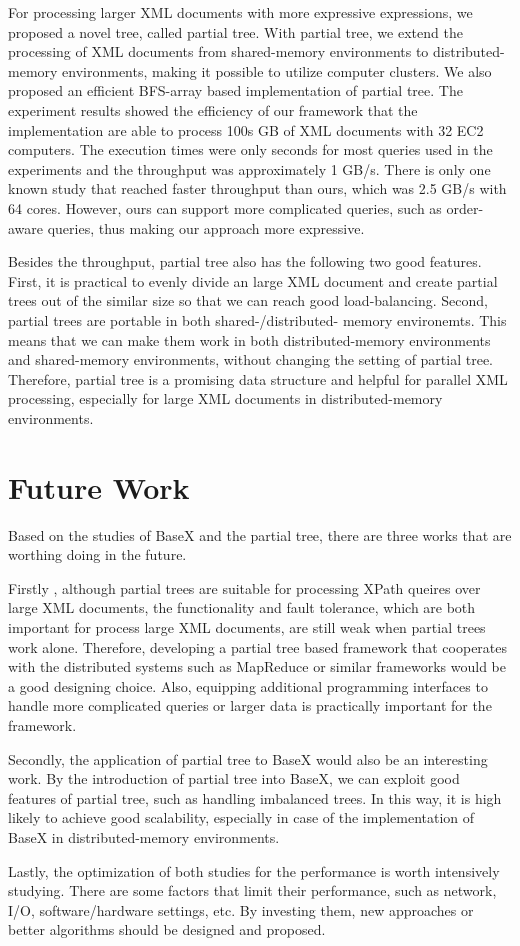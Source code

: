 For processing larger XML documents with more expressive expressions, 
we proposed a novel tree, called partial
tree. With partial tree, we extend the processing of XML documents from
shared-memory environments to distributed-memory environments, making it
possible to utilize computer clusters. We also proposed an efficient BFS-array
based implementation of partial tree. The experiment results showed the
efficiency of our framework that the implementation are able to process 100s GB
of XML documents with 32 EC2 computers. The execution times were only seconds
for most queries used in the experiments and the throughput was approximately 1
GB/s. There is only one known study that reached faster throughput than ours,
which was 2.5 GB/s with 64 cores. However, ours can support more complicated
queries, such as order-aware queries, thus making our approach more expressive.

Besides the throughput, partial tree also has the following two good features.
First, it is practical to evenly divide an large XML document and create partial
trees out of the similar size so that we can reach good load-balancing. Second,
partial trees are portable in both shared-/distributed- memory environemts. This
means that we can make them work in both distributed-memory environments and
shared-memory environments, without changing the setting of partial tree.
Therefore, partial tree is a promising data structure and helpful for parallel
XML processing, especially for large XML documents in distributed-memory
environments.

\section{Future Work}

Based on the studies of BaseX and the partial tree, there are three works that
are worthing doing in the future.


Firstly , although partial trees are suitable for processing XPath queires over
large XML documents, the functionality and fault tolerance, which are both
important for process large XML documents, are still weak when partial trees
work alone. Therefore, developing a partial tree based framework that cooperates
with the distributed systems such as MapReduce or similar frameworks would be a
good designing choice. Also, equipping additional programming interfaces to
handle more complicated queries or larger data is practically important for the
framework.

Secondly, the application of partial tree to BaseX would also be an interesting
work. By the introduction of partial tree into BaseX, we can exploit good
features of partial tree, such as handling imbalanced trees. In this way, it is
high likely to achieve good scalability, especially in case of the
implementation of BaseX in distributed-memory environments.

Lastly, the optimization of both studies for the performance is worth intensively
studying. There are some factors that limit their performance, such as network,
I/O, software/hardware settings, etc. By investing them, new approaches or better
algorithms should be designed and proposed.

